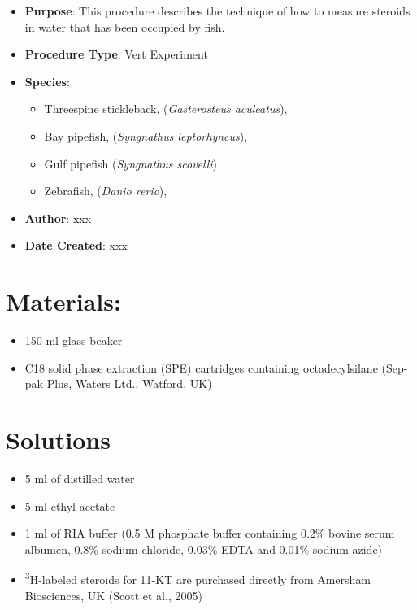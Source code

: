 \documentclass[
  letterpaper,
  DIV=11,
  numbers=noendperiod]{scrreprt}
\providecommand{\tightlist}{%
  \setlength{\itemsep}{0pt}\setlength{\parskip}{0pt}}\usepackage{longtable,booktabs,array}
\begin{document}
\begin{itemize}
\tightlist
\item
  \textbf{Purpose}: This procedure describes the technique of how to
  measure steroids in water that has been occupied by fish.
\item
  \textbf{Procedure Type}: Vert Experiment
\item
  \textbf{Species}:

  \begin{itemize}
  \tightlist
  \item
    Threespine stickleback, (\emph{Gasterosteus aculeatus}),
  \item
    Bay pipefish, (\emph{Syngnathus leptorhyncus}),
  \item
    Gulf pipefish (\emph{Syngnathus scovelli})
  \item
    Zebrafish, (\emph{Danio rerio}),
  \end{itemize}
\item
  \textbf{Author}: xxx
\item
  \textbf{Date Created}: xxx
\end{itemize}

\hypertarget{materials}{%
\section{Materials:}\label{materials}}

\begin{itemize}
\tightlist
\item
  150 ml glass beaker
\item
  C18 solid phase extraction (SPE) cartridges containing octadecylsilane
  (Sep-pak Plus, Waters Ltd., Watford, UK)
\end{itemize}

\hypertarget{solutions-71}{%
\section{Solutions}\label{solutions-71}}

\begin{itemize}
\tightlist
\item
  5 ml of distilled water
\item
  5 ml ethyl acetate
\item
  1 ml of RIA buffer (0.5 M phosphate buffer containing 0.2\% bovine
  serum albumen, 0.8\% sodium chloride, 0.03\% EDTA and 0.01\% sodium
  azide)
\item
  \textsuperscript{3}H-labeled steroids for 11-KT are purchased directly
  from Amersham Biosciences, UK (Scott et al., 2005)
\end{itemize}
\end{document}
